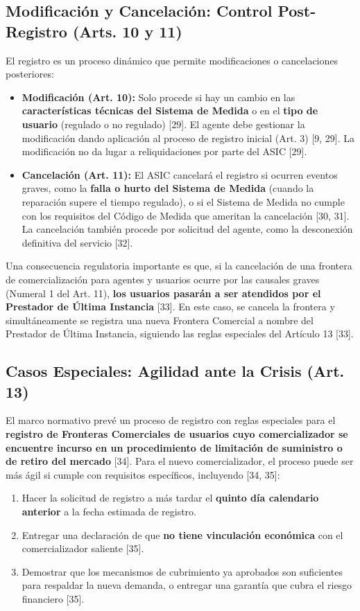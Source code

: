 \documentclass[a5paper]{book}%
\begin{document}
\subsection{Modificación y Cancelación: Control Post-Registro (Arts. 10 y 11)}

El registro es un proceso dinámico que permite modificaciones o cancelaciones posteriores:

\begin{itemize}
	\item \textbf{Modificación (Art. 10):} Solo procede si hay un cambio en las \textbf{características técnicas del Sistema de Medida} o en el \textbf{tipo de usuario} (regulado o no regulado) [29]. El agente debe gestionar la modificación dando aplicación al proceso de registro inicial (Art. 3\textdegree) [9, 29]. La modificación no da lugar a reliquidaciones por parte del ASIC [29].
	\item \textbf{Cancelación (Art. 11):} El ASIC cancelará el registro si ocurren eventos graves, como la \textbf{falla o hurto del Sistema de Medida} (cuando la reparación supere el tiempo regulado), o si el Sistema de Medida no cumple con los requisitos del Código de Medida que ameritan la cancelación [30, 31]. La cancelación también procede por solicitud del agente, como la desconexión definitiva del servicio [32].
\end{itemize}

Una consecuencia regulatoria importante es que, si la cancelación de una frontera de comercialización para agentes y usuarios ocurre por las causales graves (Numeral 1 del Art. 11), \textbf{los usuarios pasarán a ser atendidos por el Prestador de Última Instancia} [33]. En este caso, se cancela la frontera y simultáneamente se registra una nueva Frontera Comercial a nombre del Prestador de Última Instancia, siguiendo las reglas especiales del Artículo 13 [33].

\subsection{Casos Especiales: Agilidad ante la Crisis (Art. 13)}

El marco normativo prevé un proceso de registro con reglas especiales para el \textbf{registro de Fronteras Comerciales de usuarios cuyo comercializador se encuentre incurso en un procedimiento de limitación de suministro o de retiro del mercado} [34]. Para el nuevo comercializador, el proceso puede ser más ágil si cumple con requisitos específicos, incluyendo [34, 35]:
\begin{enumerate}
	\item Hacer la solicitud de registro a más tardar el \textbf{quinto día calendario anterior} a la fecha estimada de registro.
	\item Entregar una declaración de que \textbf{no tiene vinculación económica} con el comercializador saliente [35].
	\item Demostrar que los mecanismos de cubrimiento ya aprobados son suficientes para respaldar la nueva demanda, o entregar una garantía que cubra el riesgo financiero [35].
\end{enumerate}
\end{document}
